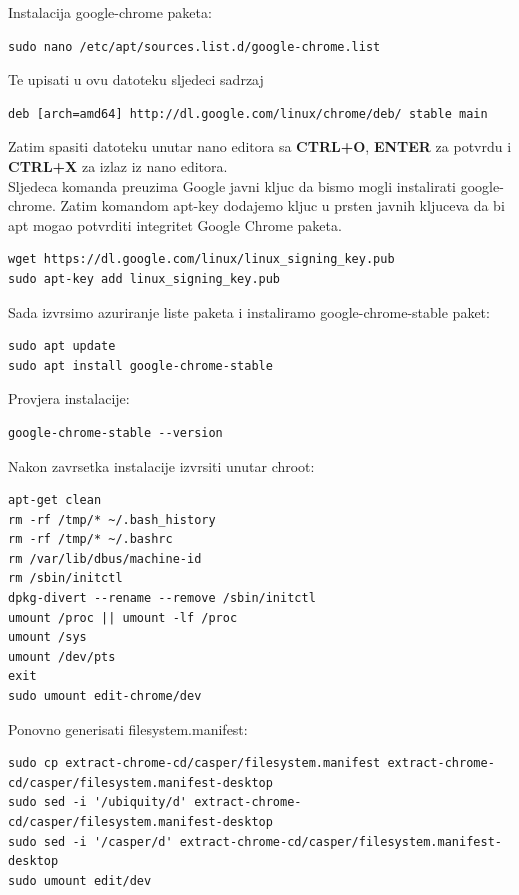 \documentclass[12pt,vi]{mitthesis}
\begin{document}
\noindent
Instalacija google-chrome paketa:
\begin{lstlisting}[style=BashInputStyle]
sudo nano /etc/apt/sources.list.d/google-chrome.list
\end{lstlisting}
Te upisati u ovu datoteku sljedeci sadrzaj
\begin{lstlisting}[style=BashInputStyle]
deb [arch=amd64] http://dl.google.com/linux/chrome/deb/ stable main
\end{lstlisting}
Zatim spasiti datoteku unutar nano editora sa \textbf{CTRL+O}, \textbf{ENTER} za potvrdu i \textbf{CTRL+X} za izlaz iz nano editora.\\
Sljedeca komanda preuzima Google javni kljuc da bismo mogli instalirati google-chrome. Zatim komandom apt-key dodajemo kljuc u prsten javnih kljuceva da bi apt mogao potvrditi integritet Google Chrome paketa.\\
\begin{lstlisting}[style=BashInputStyle]
wget https://dl.google.com/linux/linux_signing_key.pub
sudo apt-key add linux_signing_key.pub
\end{lstlisting}

Sada izvrsimo azuriranje liste paketa i instaliramo google-chrome-stable paket:
\begin{lstlisting}[style=BashInputStyle]
sudo apt update
sudo apt install google-chrome-stable
\end{lstlisting}

Provjera instalacije:
\begin{lstlisting}[style=BashInputStyle]
google-chrome-stable --version
\end{lstlisting}

\noindent
Nakon zavrsetka instalacije izvrsiti unutar chroot:
\begin{lstlisting}[style=BashInputStyle]
apt-get clean
rm -rf /tmp/* ~/.bash_history
rm -rf /tmp/* ~/.bashrc
rm /var/lib/dbus/machine-id
rm /sbin/initctl
dpkg-divert --rename --remove /sbin/initctl
umount /proc || umount -lf /proc
umount /sys
umount /dev/pts
exit
sudo umount edit-chrome/dev
\end{lstlisting}

\noindent
Ponovno generisati filesystem.manifest:
\begin{lstlisting}[style=BashInputStyle]
sudo cp extract-chrome-cd/casper/filesystem.manifest extract-chrome-cd/casper/filesystem.manifest-desktop
sudo sed -i '/ubiquity/d' extract-chrome-cd/casper/filesystem.manifest-desktop
sudo sed -i '/casper/d' extract-chrome-cd/casper/filesystem.manifest-desktop
sudo umount edit/dev
\end{lstlisting}
\end{document}
